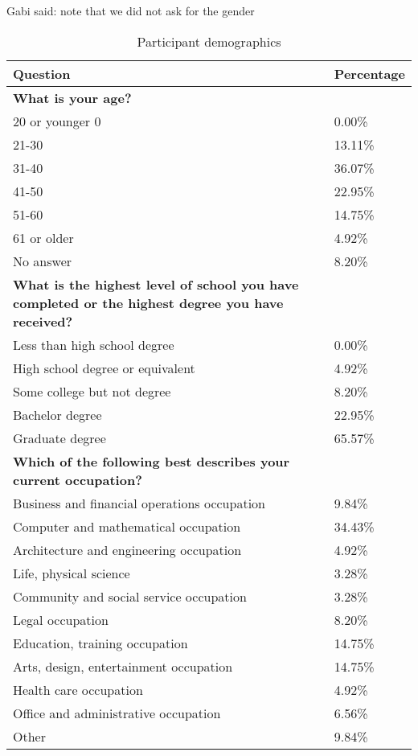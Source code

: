 \documentclass[11pt]{article}
\begin{document}
{\color{blue} Gabi said: note that we did not ask for the gender}


\begin{table}
\caption{Participant demographics}
\begin{small}
\begin{tabular}{ll}
\hline
\textbf{Question} & \textbf{Percentage} \\ \hline 
\textbf{What is your age?} &  \\ 
20 or younger 0	& 0.00\% \\
21-30 & 	 13.11\% \\
31-40 & 36.07\% \\
41-50 	& 22.95\% \\ 
51-60 	& 14.75\% \\
61 or older & 4.92\% \\
No answer &	 8.20\% \\ \hline

\textbf{What is the highest level of school you have completed or the highest degree you have received?} & \\ 
Less than high school degree & 0.00\% \\ 
High school degree or equivalent & 4.92\% \\
Some college but not degree & 8.20\% \\
Bachelor degree & 22.95\% \\
Graduate degree & 65.57\% \\ \hline

\textbf{Which of the following best describes your current occupation?} & \\
Business and financial operations occupation & 9.84\% \\
Computer and mathematical occupation & 34.43\% \\
Architecture and engineering occupation & 	4.92\% \\
Life, physical science &  3.28\%  \\
Community and social service occupation & 3.28\% \\
Legal occupation & 	8.20\% \\
Education, training occupation & 	14.75\% \\
Arts, design, entertainment occupation & 14.75\% \\
Health care occupation & 4.92\% \\
Office and administrative occupation & 6.56\% \\
Other &	9.84\% \\ \hline
\end{tabular}
\label{participants}
\end{small}
\end{table}
\end{document}
